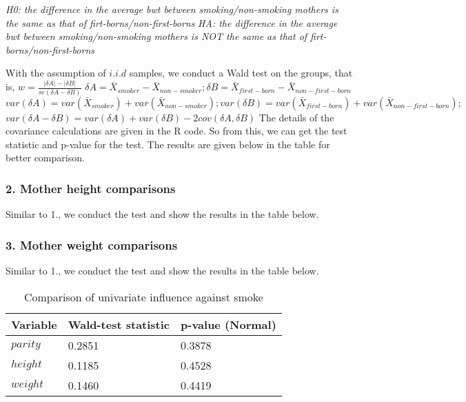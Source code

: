 \documentclass{article}\usepackage{graphicx, color}
\begin{document}
\hspace{12 pt} \textit{H0: the difference in the average bwt between smoking/non-smoking mothers is the same as that of firt-borns/non-first-borns} \newline
\vspace{2 pt}
\hspace{24 pt} \textit{HA: the difference in the average bwt between
  smoking/non-smoking mothers is NOT the same as that of firt-borns/non-first-borns} \newline


With the assumption of $i.i.d$ samples, we conduct a Wald test on the
groups, that is, \newline
$w = \displaystyle \frac{|\delta A| - |\delta B|}{se(\delta A - \delta  B)}$\newline
$\delta A=\bar X_{smoker} - \bar X_{non-smoker}; 
\delta B=\bar X_{first-born} - \bar X_{non-first-born}$\newline
$var(\delta A) = var(\bar X_{smoker})+var(\bar X_{non-smoker});
var(\delta B) = var(\bar X_{first-born})+var(\bar X_{non-first-born});$\newline
$var(\delta A - \delta B) = var(\delta A) + var(\delta B) -
2cov(\delta A, \delta B)$\newline
The details of the covariance calculations are given in the R code. So
from this, we can get the test statistic and p-value for the test. The
results are given below in the table for better comparison.

\subsubsection*{2. Mother height comparisons}
\hspace{12 pt} Similar to 1., we conduct the test and show the results
in the table below.

\subsubsection*{3. Mother weight comparisons}
\hspace{12 pt} Similar to 1., we conduct the test and show the results
in the table below.


\begin{table}
\caption{Comparison of univariate influence against smoke} \label{tab:title}
\begin{center}
\begin{tabular}{|l|l|l|}
Variable & Wald-test statistic & p-value (Normal) \\ \hline
{$parity$} & 0.2851 & 0.3878 \\ 
{$height$} & 0.1185 & 0.4528 \\ 
{$weight$} & 0.1460 & 0.4419 \\ 
\end{tabular}
\end{center}
\end{table}
\end{document}
